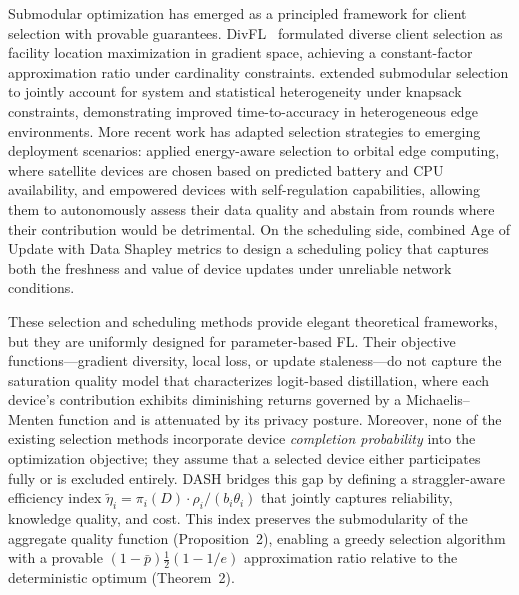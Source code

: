 \documentclass[a4paper,fleqn]{cas-dc}
\begin{document}
	Submodular optimization has emerged as a principled framework for
	client selection with provable guarantees.
	DivFL~\citep{balakrishnan_divfl_2022} formulated diverse client
	selection as facility location maximization in gradient space,
	achieving a constant-factor approximation ratio under cardinality
	constraints. \citet{zhang_submod_tosn_2024} extended
	submodular selection to jointly account for system and statistical
	heterogeneity under knapsack constraints, demonstrating improved
	time-to-accuracy in heterogeneous edge environments.
	More recent work has adapted selection strategies to emerging
	deployment scenarios: \citet{alblewi_fedscs_2025}
	applied energy-aware selection to orbital edge computing, where
	satellite devices are chosen based on predicted battery and CPU
	availability, and \citet{talukder_fedsrc_2025}
	empowered devices with self-regulation capabilities, allowing them to
	autonomously assess their data quality and abstain from rounds where
	their contribution would be detrimental. On the scheduling side,
	\citet{khan_voi_scheduling_2024} combined Age of Update with
	Data Shapley metrics to design a scheduling policy that captures both
	the freshness and value of device updates under unreliable network conditions.
	
	These selection and scheduling methods provide elegant theoretical
	frameworks, but they are uniformly designed for parameter-based FL.
	Their objective functions---gradient diversity, local loss, or update
	staleness---do not capture the saturation quality model that
	characterizes logit-based distillation, where each device's
	contribution exhibits diminishing returns governed by a
	Michaelis--Menten function and is attenuated by its privacy posture.
	Moreover, none of the existing selection methods incorporate device
	\emph{completion probability} into the optimization objective; they
	assume that a selected device either participates fully or is excluded
	entirely. DASH bridges this gap by defining a straggler-aware
	efficiency index $\tilde{\eta}_i = \pi_i(D) \cdot \rho_i / (b_i
	\theta_i)$ that jointly captures reliability, knowledge quality, and
	cost. This index preserves the submodularity of the aggregate quality
	function (Proposition~2), enabling a greedy selection algorithm with a
	provable $(1-\bar{p})\frac{1}{2}(1-1/e)$ approximation ratio relative
	to the deterministic optimum (Theorem~2).
	
	
	
	
\end{document}
